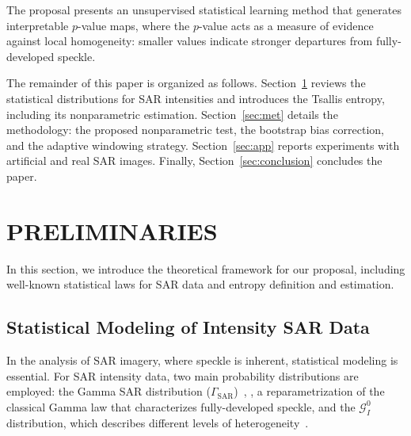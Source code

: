 \documentclass[
  lettersize  journal,
]{IEEEtran}%
\begin{document}
The proposal presents an unsupervised statistical learning method that
generates interpretable \(p\)-value maps, where the \(p\)-value acts as
a measure of evidence against local homogeneity: smaller values indicate
stronger departures from fully-developed speckle.

The remainder of this paper is organized as follows.
Section~\ref{sec:pre} reviews the statistical distributions for SAR
intensities and introduces the Tsallis entropy, including its
nonparametric estimation. Section~\ref{sec:met} details the methodology:
the proposed nonparametric test, the bootstrap bias correction, and the
adaptive windowing strategy. Section~\ref{sec:app} reports experiments
with artificial and real SAR images. Finally,
Section~\ref{sec:conclusion} concludes the paper.

\section{PRELIMINARIES}\label{sec:pre}

In this section, we introduce the theoretical framework for our
proposal, including well-known statistical laws for SAR data and entropy
definition and estimation.

\subsection{Statistical Modeling of Intensity SAR
Data}\label{statistical-modeling-of-intensity-sar-data}

In the analysis of SAR imagery, where speckle is inherent, statistical
modeling is essential. For SAR intensity data, two main probability
distributions are employed: the Gamma SAR distribution
(\(\Gamma_{\mathrm{SAR}}\))~,
, a reparametrization of the classical
Gamma law that characterizes fully-developed speckle, and the
\(\mathcal{G}^0_I\) distribution, which describes different levels of
heterogeneity~.
\end{document}
